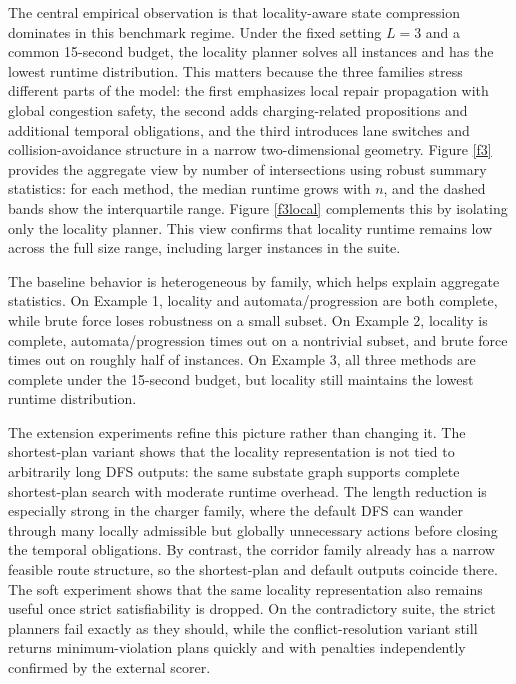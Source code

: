 \documentclass[]{jair}
\begin{document}
The central empirical observation is that locality-aware state compression dominates in this benchmark regime. Under the fixed setting $L=3$ and a common 15-second budget, the locality planner solves all instances and has the lowest runtime distribution. This matters because the three families stress different parts of the model: the first emphasizes local repair propagation with global congestion safety, the second adds charging-related propositions and additional temporal obligations, and the third introduces lane switches and collision-avoidance structure in a narrow two-dimensional geometry.
Figure \ref{f3} provides the aggregate view by number of intersections using robust summary statistics: for each method, the median runtime grows with $n$, and the dashed bands show the interquartile range. Figure \ref{f3local} complements this by isolating only the locality planner. This view confirms that locality runtime remains low across the full size range, including larger instances in the suite.

The baseline behavior is heterogeneous by family, which helps explain aggregate statistics. On Example 1, locality and automata/progression are both complete, while brute force loses robustness on a small subset. On Example 2, locality is complete, automata/progression times out on a nontrivial subset, and brute force times out on roughly half of instances. On Example 3, all three methods are complete under the 15-second budget, but locality still maintains the lowest runtime distribution.

The extension experiments refine this picture rather than changing it. The shortest-plan variant shows that the locality representation is not tied to arbitrarily long DFS outputs: the same substate graph supports complete shortest-plan search with moderate runtime overhead. The length reduction is especially strong in the charger family, where the default DFS can wander through many locally admissible but globally unnecessary actions before closing the temporal obligations. By contrast, the corridor family already has a narrow feasible route structure, so the shortest-plan and default outputs coincide there. The soft experiment shows that the same locality representation also remains useful once strict satisfiability is dropped. On the contradictory suite, the strict planners fail exactly as they should, while the conflict-resolution variant still returns minimum-violation plans quickly and with penalties independently confirmed by the external scorer.
\end{document}
